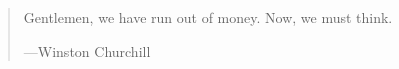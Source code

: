 \phantom{.}
\vspace{4in}

\begin{singlespace}
\begin{quote}
  Gentlemen, we have run out of money. Now, we must think.
  \begin{flushright}
    ---Winston Churchill
  \end{flushright}
\end{quote}
\end{singlespace}
